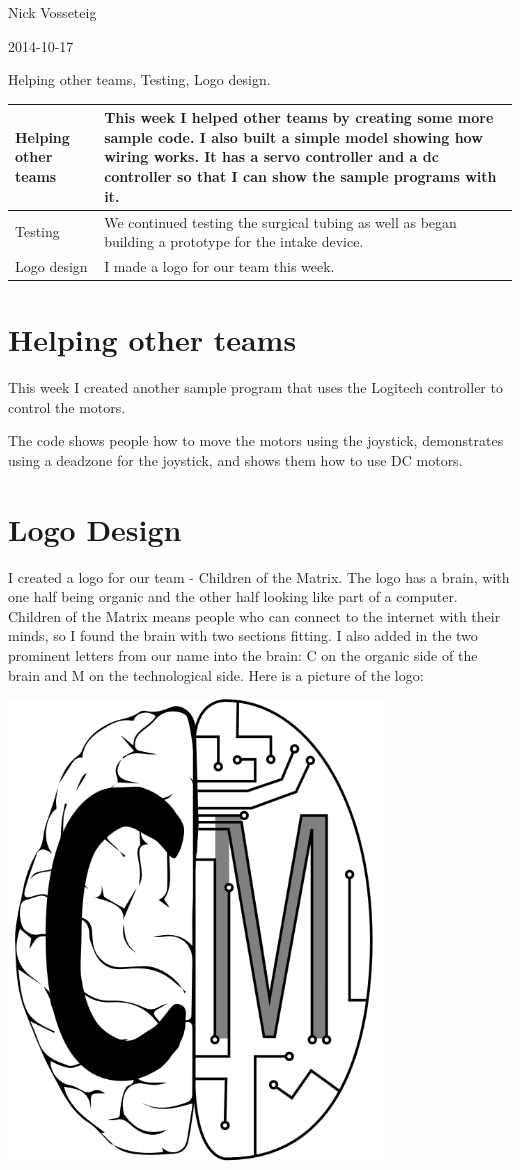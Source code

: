 Nick Vosseteig

2014-10-17

Helping other teams, Testing, Logo design.

\begin{tabular}{|p{5cm}|p{5cm}|}
 \hline
 Helping other teams&
This week I helped other teams by creating some more sample code. I also built a simple model showing how wiring works. It has a servo controller and a dc controller so that I can show the sample programs with it. 
 \\
 \hline
Testing&
We continued testing the surgical tubing as well as began building a prototype for the intake device.
 \\
 \hline
 Logo design&
I made a logo for our team this week.
 \\
 \hline
\end{tabular}

\section*{Helping other teams}
This week I created another sample program that uses the Logitech controller to control the motors.



The code shows people how to move the motors using the joystick, demonstrates using a deadzone for the joystick, and shows them how to use DC motors.

\section*{Logo Design}
I created a logo for our team - Children of the Matrix. The logo has a brain, with one half being organic and the other half looking like part of a computer. Children of the Matrix means people who can connect to the internet with their minds, so I found the brain with two sections fitting. I also added in the two prominent letters from our name into the brain: C on the organic side of the brain and M on the technological side.
Here is a picture of the logo:


\begin{center}
 \includegraphics[width=10cm]{./Entries/Images/logo.png}
\end{center}
